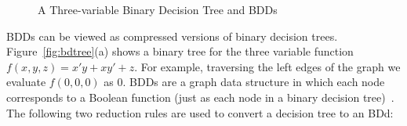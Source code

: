 \documentclass[defaultstyle,11pt]{thesis}
\begin{document}
\begin{figure}
  \centering
  \hspace{5mm}
  \hspace{5mm}
  \hspace{5mm}
  \caption{A Three-variable Binary Decision Tree and BDDs} 
  \label{fig:bdtree}
  \label{fig:reorderbdd}
  \label{fig:robdd}
\end{figure}

BDDs can be viewed as compressed versions of binary decision trees.
Figure~\ref{fig:bdtree}(a) shows a binary tree for the three variable
function $f(x,y,z) = x'y + xy' + z$.  For example, traversing the left
edges of the graph we evaluate $f(0,0,0)$ as $0$.  BDDs are a graph
data structure in which each node corresponds to a Boolean function
(just as each node in a binary decision
tree)~\cite{bryant:86:ieeetc}. The following two reduction rules are
used to convert a decision tree to an BDd:
\end{document}

